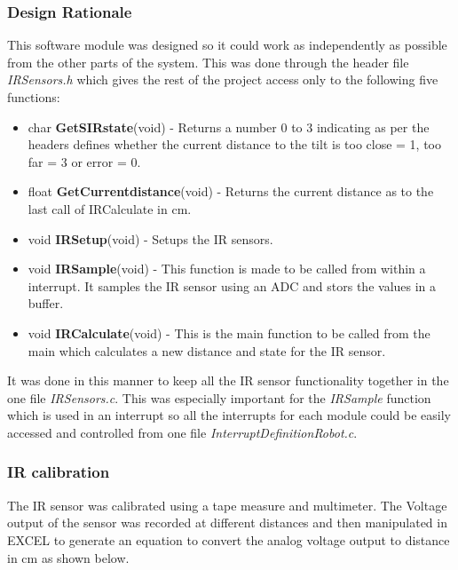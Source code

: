 \documentclass[MTRX3700report.tex]{subfiles}
\begin{document}
\subsubsection{Design Rationale}
This software module was designed so it could work as independently as possible from the other parts of the system. This was done through the header file \textit{IR\textunderscore Sensors.h} which gives the rest of the project access only to the following five functions:

\begin{itemize}
	\item char \textbf{Get\textunderscore S\textunderscore IR\textunderscore state}(void) - Returns a number 0 to 3 indicating as per the headers defines whether the current distance to the tilt is too close = 1, too far = 3 or error = 0.
	\item float \textbf{Get\textunderscore Current\textunderscore distance}(void) -  Returns the current distance as to the last call of IR\textunderscore Calculate in cm.  
	\item void \textbf{IR\textunderscore Setup}(void) - Setups the IR sensors. 
	\item void \textbf{IR\textunderscore  Sample}(void) - This function is made to be called from within a interrupt. It samples the IR sensor using an ADC and stors the values in a buffer. 
	\item void \textbf{IR\textunderscore  Calculate}(void) - This is the main function to be called from the main which calculates a new distance and state for the IR sensor. 
\end{itemize}

It was done in this manner to keep all the IR sensor functionality together in the one file \textit{IR\textunderscore Sensors.c}. This was especially important for the \textit{IR\textunderscore Sample} function which is used in an interrupt so all the interrupts for each module could be easily accessed and controlled from one file \textit{Interrupt\textunderscore Definition\textunderscore Robot.c}.



\subsubsection{IR calibration}
The IR sensor was calibrated using a tape measure and multimeter. The Voltage output of the sensor was recorded at different distances and then manipulated in EXCEL to generate an equation to convert the analog voltage output to distance in cm as shown below. 
\end{document}
